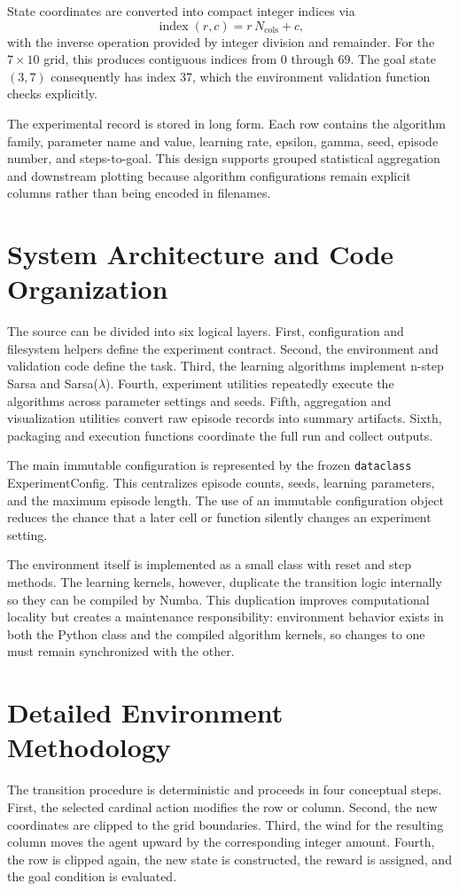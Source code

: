 \documentclass[11pt,a4paper]{article}
\begin{document}
State coordinates are converted into compact integer indices via
\begin{equation}
\operatorname{index}(r,c)=r\,N_{\text{cols}}+c,
\label{eq:stateindex}
\end{equation}
with the inverse operation provided by integer division and remainder. For the $7\times10$ grid, this produces contiguous indices from $0$ through $69$. The goal state $(3,7)$ consequently has index $37$, which the environment validation function checks explicitly.

The experimental record is stored in long form. Each row contains the algorithm family, parameter name and value, learning rate, epsilon, gamma, seed, episode number, and steps-to-goal. This design supports grouped statistical aggregation and downstream plotting because algorithm configurations remain explicit columns rather than being encoded in filenames.

\section{System Architecture and Code Organization}
The source can be divided into six logical layers. First, configuration and filesystem helpers define the experiment contract. Second, the environment and validation code define the task. Third, the learning algorithms implement n-step Sarsa and Sarsa($\lambda$). Fourth, experiment utilities repeatedly execute the algorithms across parameter settings and seeds. Fifth, aggregation and visualization utilities convert raw episode records into summary artifacts. Sixth, packaging and execution functions coordinate the full run and collect outputs.

The main immutable configuration is represented by the frozen \texttt{dataclass} ExperimentConfig. This centralizes episode counts, seeds, learning parameters, and the maximum episode length. The use of an immutable configuration object reduces the chance that a later cell or function silently changes an experiment setting.

The environment itself is implemented as a small class with reset and step methods. The learning kernels, however, duplicate the transition logic internally so they can be compiled by Numba. This duplication improves computational locality but creates a maintenance responsibility: environment behavior exists in both the Python class and the compiled algorithm kernels, so changes to one must remain synchronized with the other.

\section{Detailed Environment Methodology}
The transition procedure is deterministic and proceeds in four conceptual steps. First, the selected cardinal action modifies the row or column. Second, the new coordinates are clipped to the grid boundaries. Third, the wind for the resulting column moves the agent upward by the corresponding integer amount. Fourth, the row is clipped again, the new state is constructed, the reward is assigned, and the goal condition is evaluated.
\end{document}
